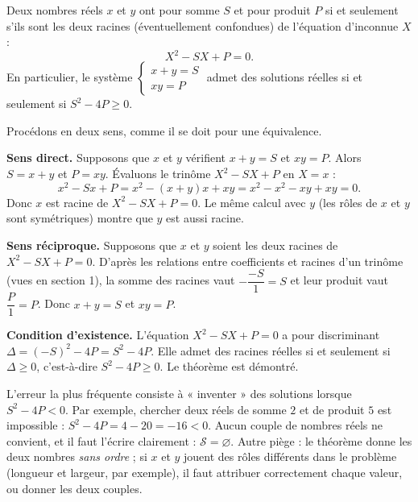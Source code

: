 \documentclass[11pt]{article}
\begin{document}
\begin{propriete}
Deux nombres réels $x$ et $y$ ont pour somme $S$ et pour produit $P$ si et seulement s'ils sont les deux racines (éventuellement confondues) de l'équation d'inconnue $X$ :
\[
X^2 - SX + P = 0.
\]
En particulier, le système $\begin{cases} x+y=S \\ xy=P \end{cases}$ admet des solutions réelles si et seulement si $S^2 - 4P \geq 0$.
\end{propriete}

\begin{experience}
Procédons en deux sens, comme il se doit pour une équivalence.

\textbf{Sens direct.} Supposons que $x$ et $y$ vérifient $x+y=S$ et $xy=P$. Alors $S = x+y$ et $P = xy$. Évaluons le trinôme $X^2 - SX + P$ en $X = x$ :
\[
x^2 - Sx + P = x^2 - (x+y)x + xy = x^2 - x^2 - xy + xy = 0.
\]
Donc $x$ est racine de $X^2 - SX + P = 0$. Le même calcul avec $y$ (les rôles de $x$ et $y$ sont symétriques) montre que $y$ est aussi racine.

\textbf{Sens réciproque.} Supposons que $x$ et $y$ soient les deux racines de $X^2 - SX + P = 0$. D'après les relations entre coefficients et racines d'un trinôme (vues en section 1), la somme des racines vaut $-\dfrac{-S}{1} = S$ et leur produit vaut $\dfrac{P}{1} = P$. Donc $x+y=S$ et $xy=P$.

\textbf{Condition d'existence.} L'équation $X^2 - SX + P = 0$ a pour discriminant $\Delta = (-S)^2 - 4P = S^2 - 4P$. Elle admet des racines réelles si et seulement si $\Delta \geq 0$, c'est-à-dire $S^2 - 4P \geq 0$. Le théorème est démontré.
\end{experience}

\begin{attention}
L'erreur la plus fréquente consiste à « inventer » des solutions lorsque $S^2 - 4P < 0$. Par exemple, chercher deux réels de somme $2$ et de produit $5$ est impossible : $S^2 - 4P = 4 - 20 = -16 < 0$. Aucun couple de nombres réels ne convient, et il faut l'écrire clairement : $\mathcal{S} = \varnothing$. Autre piège : le théorème donne les deux nombres \emph{sans ordre} ; si $x$ et $y$ jouent des rôles différents dans le problème (longueur et largeur, par exemple), il faut attribuer correctement chaque valeur, ou donner les deux couples.
\end{attention}
\end{document}

